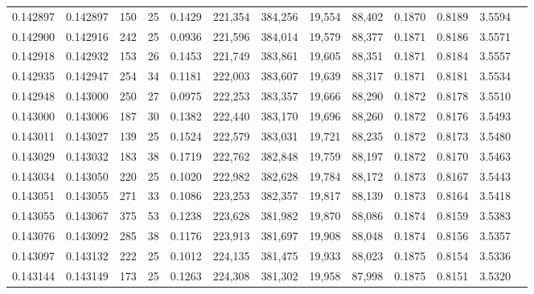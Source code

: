 \begin{tabular}{rrrrrrrrrrrrr}
0.142897 & 0.142897 &   150 &  25 &                                     0.1429 & 221,354 & 384,256 &  19,554 &  88,402 & 0.1870 & 0.8189 & 3.5594 \\
0.142900 & 0.142916 &   242 &  25 &                                     0.0936 & 221,596 & 384,014 &  19,579 &  88,377 & 0.1871 & 0.8186 & 3.5571 \\
0.142918 & 0.142932 &   153 &  26 &                                     0.1453 & 221,749 & 383,861 &  19,605 &  88,351 & 0.1871 & 0.8184 & 3.5557 \\
0.142935 & 0.142947 &   254 &  34 &                                     0.1181 & 222,003 & 383,607 &  19,639 &  88,317 & 0.1871 & 0.8181 & 3.5534 \\
0.142948 & 0.143000 &   250 &  27 &                                     0.0975 & 222,253 & 383,357 &  19,666 &  88,290 & 0.1872 & 0.8178 & 3.5510 \\
0.143000 & 0.143006 &   187 &  30 &                                     0.1382 & 222,440 & 383,170 &  19,696 &  88,260 & 0.1872 & 0.8176 & 3.5493 \\
0.143011 & 0.143027 &   139 &  25 &                                     0.1524 & 222,579 & 383,031 &  19,721 &  88,235 & 0.1872 & 0.8173 & 3.5480 \\
0.143029 & 0.143032 &   183 &  38 &                                     0.1719 & 222,762 & 382,848 &  19,759 &  88,197 & 0.1872 & 0.8170 & 3.5463 \\
0.143034 & 0.143050 &   220 &  25 &                                     0.1020 & 222,982 & 382,628 &  19,784 &  88,172 & 0.1873 & 0.8167 & 3.5443 \\
0.143051 & 0.143055 &   271 &  33 &                                     0.1086 & 223,253 & 382,357 &  19,817 &  88,139 & 0.1873 & 0.8164 & 3.5418 \\
0.143055 & 0.143067 &   375 &  53 &                                     0.1238 & 223,628 & 381,982 &  19,870 &  88,086 & 0.1874 & 0.8159 & 3.5383 \\
0.143076 & 0.143092 &   285 &  38 &                                     0.1176 & 223,913 & 381,697 &  19,908 &  88,048 & 0.1874 & 0.8156 & 3.5357 \\
0.143097 & 0.143132 &   222 &  25 &                                     0.1012 & 224,135 & 381,475 &  19,933 &  88,023 & 0.1875 & 0.8154 & 3.5336 \\
0.143144 & 0.143149 &   173 &  25 &                                     0.1263 & 224,308 & 381,302 &  19,958 &  87,998 & 0.1875 & 0.8151 & 3.5320 \\

\end{tabular}
